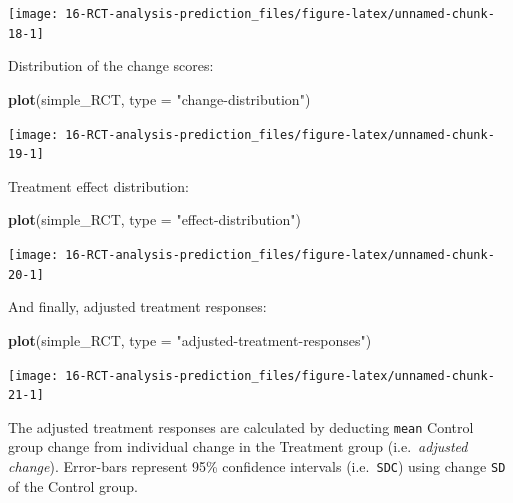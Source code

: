 \documentclass[
]{book}
\newenvironment{Shaded}{\begin{snugshade}}{\end{snugshade}}
\newcommand{\DataTypeTok}[1]{\textcolor[rgb]{0.13,0.29,0.53}{#1}}
\newcommand{\KeywordTok}[1]{\textcolor[rgb]{0.13,0.29,0.53}{\textbf{#1}}}
\newcommand{\NormalTok}[1]{#1}
\newcommand{\StringTok}[1]{\textcolor[rgb]{0.31,0.60,0.02}{#1}}
\begin{document}
\begin{center}\texttt{[image: 16-RCT-analysis-prediction\_files/figure-latex/unnamed-chunk-18-1]} \end{center}

Distribution of the change scores:

\begin{Shaded}
\begin{Highlighting}[]
\KeywordTok{plot}\NormalTok{(simple\_RCT, }\DataTypeTok{type =} \StringTok{"change{-}distribution"}\NormalTok{)}
\end{Highlighting}
\end{Shaded}

\begin{center}\texttt{[image: 16-RCT-analysis-prediction\_files/figure-latex/unnamed-chunk-19-1]} \end{center}

Treatment effect distribution:

\begin{Shaded}
\begin{Highlighting}[]
\KeywordTok{plot}\NormalTok{(simple\_RCT, }\DataTypeTok{type =} \StringTok{"effect{-}distribution"}\NormalTok{)}
\end{Highlighting}
\end{Shaded}

\begin{center}\texttt{[image: 16-RCT-analysis-prediction\_files/figure-latex/unnamed-chunk-20-1]} \end{center}

And finally, adjusted treatment responses:

\begin{Shaded}
\begin{Highlighting}[]
\KeywordTok{plot}\NormalTok{(simple\_RCT, }\DataTypeTok{type =} \StringTok{"adjusted{-}treatment{-}responses"}\NormalTok{)}
\end{Highlighting}
\end{Shaded}

\begin{center}\texttt{[image: 16-RCT-analysis-prediction\_files/figure-latex/unnamed-chunk-21-1]} \end{center}

The adjusted treatment responses are calculated by deducting \texttt{mean} Control group change from individual change in the Treatment group (i.e.~\emph{adjusted change}). Error-bars represent 95\% confidence intervals (i.e.~\texttt{SDC}) using change \texttt{SD} of the Control group.
\end{document}
